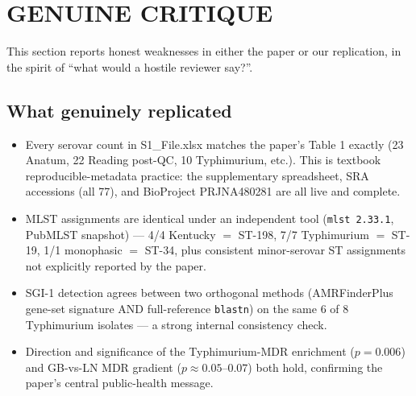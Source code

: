 \documentclass[11pt]{article}
\begin{document}
\section{GENUINE CRITIQUE}
This section reports honest weaknesses in either the paper or our replication, in the spirit of ``what would a hostile reviewer say?''.

\subsection{What genuinely replicated}
\begin{itemize}
  \item Every serovar count in S1\_File.xlsx matches the paper's Table 1 exactly (23 Anatum, 22 Reading post-QC, 10 Typhimurium, etc.). This is textbook reproducible-metadata practice: the supplementary spreadsheet, SRA accessions (all 77), and BioProject PRJNA480281 are all live and complete.
  \item MLST assignments are identical under an independent tool (\texttt{mlst 2.33.1}, PubMLST snapshot) --- 4/4 Kentucky $=$ ST-198, 7/7 Typhimurium $=$ ST-19, 1/1 monophasic $=$ ST-34, plus consistent minor-serovar ST assignments not explicitly reported by the paper.
  \item SGI-1 detection agrees between two orthogonal methods (AMRFinderPlus gene-set signature AND full-reference \texttt{blastn}) on the same 6 of 8 Typhimurium isolates --- a strong internal consistency check.
  \item Direction and significance of the Typhimurium-MDR enrichment ($p = 0.006$) and GB-vs-LN MDR gradient ($p \approx 0.05$--$0.07$) both hold, confirming the paper's central public-health message.
\end{itemize}
\end{document}
